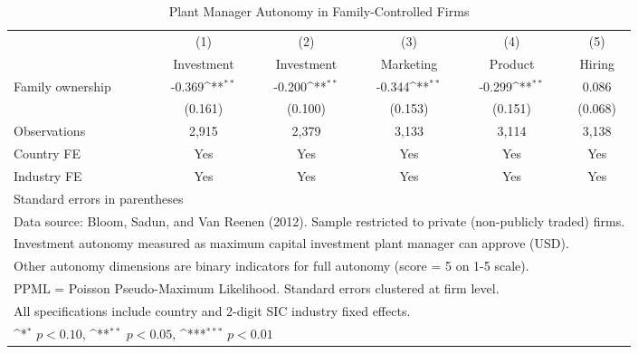 \begin{table}[htbp]\centering
\def\sym#1{\ifmmode^{#1}\else\(^{#1}\)\fi}
\caption{Plant Manager Autonomy in Family-Controlled Firms}
\begin{tabular}{l*{5}{c}}
\toprule
                    &\multicolumn{1}{c}{(1)}&\multicolumn{1}{c}{(2)}&\multicolumn{1}{c}{(3)}&\multicolumn{1}{c}{(4)}&\multicolumn{1}{c}{(5)}\\
                    &\multicolumn{1}{c}{Investment}&\multicolumn{1}{c}{Investment}&\multicolumn{1}{c}{Marketing}&\multicolumn{1}{c}{Product}&\multicolumn{1}{c}{Hiring}\\
\midrule
Family ownership    &      -0.369\sym{**} &      -0.200\sym{**} &      -0.344\sym{**} &      -0.299\sym{**} &       0.086         \\
                    &     (0.161)         &     (0.100)         &     (0.153)         &     (0.151)         &     (0.068)         \\
\midrule
Observations        &       2,915         &       2,379         &       3,133         &       3,114         &       3,138         \\
Country FE          &         Yes         &         Yes         &         Yes         &         Yes         &         Yes         \\
Industry FE         &         Yes         &         Yes         &         Yes         &         Yes         &         Yes         \\
\bottomrule
\multicolumn{6}{l}{\footnotesize Standard errors in parentheses}\\
\multicolumn{6}{l}{\footnotesize Data source: Bloom, Sadun, and Van Reenen (2012). Sample restricted to private (non-publicly traded) firms.}\\
\multicolumn{6}{l}{\footnotesize Investment autonomy measured as maximum capital investment plant manager can approve (USD).}\\
\multicolumn{6}{l}{\footnotesize Other autonomy dimensions are binary indicators for full autonomy (score = 5 on 1-5 scale).}\\
\multicolumn{6}{l}{\footnotesize PPML = Poisson Pseudo-Maximum Likelihood. Standard errors clustered at firm level.}\\
\multicolumn{6}{l}{\footnotesize All specifications include country and 2-digit SIC industry fixed effects.}\\
\multicolumn{6}{l}{\footnotesize \sym{*} \(p<0.10\), \sym{**} \(p<0.05\), \sym{***} \(p<0.01\)}\\
\end{tabular}
\end{table}
